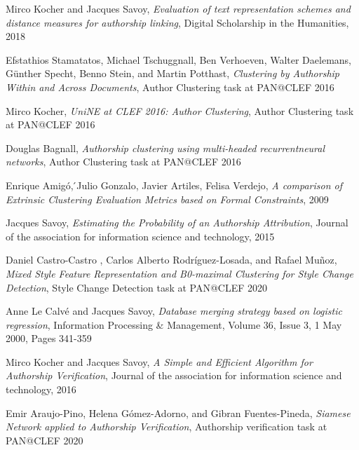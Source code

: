 \begin{thebibliography}{9}


Mirco Kocher and Jacques Savoy,
\textit{Evaluation of text representation schemes and distance measures for authorship linking},
Digital Scholarship in the Humanities, 2018

Efstathios Stamatatos, Michael Tschuggnall, Ben Verhoeven, Walter Daelemans, Günther Specht, Benno Stein, and Martin Potthast,
\textit{Clustering by Authorship Within and Across Documents},
Author Clustering task at PAN@CLEF 2016

Mirco Kocher,
\textit{UniNE at CLEF 2016: Author Clustering},
Author Clustering task at PAN@CLEF 2016

Douglas Bagnall,
\textit{Authorship clustering using multi-headed recurrentneural networks},
Author Clustering task at PAN@CLEF 2016


Enrique Amigó, ́Julio Gonzalo, Javier Artiles, Felisa Verdejo,
\textit{A comparison of Extrinsic Clustering Evaluation Metrics based on Formal Constraints},
2009

Jacques Savoy,
\textit{Estimating the Probability of an Authorship Attribution},
Journal of the association for information science and technology, 2015

Daniel Castro-Castro , Carlos Alberto Rodríguez-Losada, and Rafael Muñoz,
\textit{Mixed Style Feature Representation and B0-maximal Clustering for Style Change Detection},
Style Change Detection task at PAN@CLEF 2020

Anne Le Calvé and Jacques Savoy,
\textit{Database merging strategy based on logistic regression},
Information Processing \& Management, Volume 36, Issue 3, 1 May 2000, Pages 341-359

Mirco Kocher and Jacques Savoy,
\textit{A Simple and Efficient Algorithm for Authorship Verification},
Journal of the association for information science and technology, 2016

Emir Araujo-Pino, Helena Gómez-Adorno, and Gibran Fuentes-Pineda,
\textit{Siamese Network applied to Authorship Verification},
Authorship verification task at PAN@CLEF 2020


\end{thebibliography}
